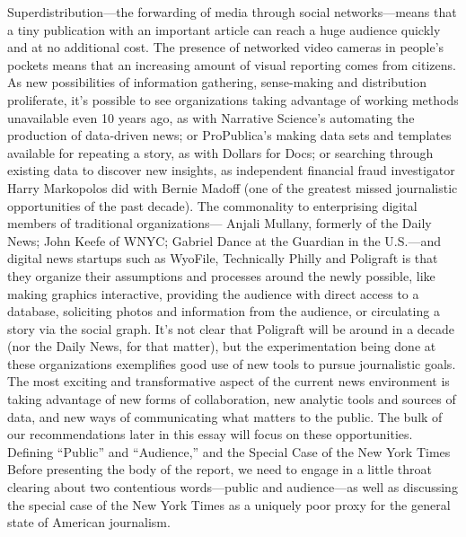 Superdistribution—the forwarding of media through social networks—means
that a tiny publication with an important article can reach a huge audience
quickly and at no additional cost. The presence of networked video cameras
in people’s pockets means that an increasing amount of visual reporting comes
from citizens.
As new possibilities of information gathering, sense-making and distribution
proliferate, it’s possible to see organizations taking advantage of working methods
unavailable even 10 years ago, as with Narrative Science’s automating the
production of data-driven news; or ProPublica’s making data sets and templates
available for repeating a story, as with Dollars for Docs; or searching through
existing data to discover new insights, as independent financial fraud investigator
Harry Markopolos did with Bernie Madoff (one of the greatest missed journalistic
opportunities of the past decade).
The commonality to enterprising digital members of traditional organizations—
Anjali Mullany, formerly of the Daily News; John Keefe of WNYC; Gabriel
Dance at the Guardian in the U.S.—and digital news startups such as WyoFile,
Technically Philly and Poligraft is that they organize their assumptions and processes
around the newly possible, like making graphics interactive, providing the
audience with direct access to a database, soliciting photos and information from
the audience, or circulating a story via the social graph. It’s not clear that Poligraft
will be around in a decade (nor the Daily News, for that matter), but the experimentation
being done at these organizations exemplifies good use of new tools
to pursue journalistic goals.
The most exciting and transformative aspect of the current news environment is
taking advantage of new forms of collaboration, new analytic tools and sources
of data, and new ways of communicating what matters to the public. The bulk of
our recommendations later in this essay will focus on these opportunities.
Defining ``Public'' and ``Audience,'' and the Special Case of the New York Times
Before presenting the body of the report, we need to engage in a little throat
clearing about two contentious words—public and audience—as well as discussing
the special case of the New York Times as a uniquely poor proxy for the
general state of American journalism.


